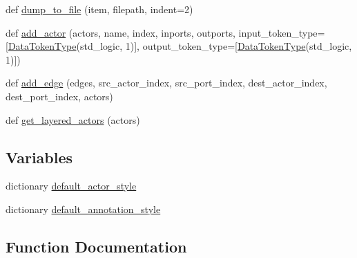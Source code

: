 \begin{DoxyCompactItemize}
\item 
def \hyperlink{namespacesylva_1_1base_1_1sdf_a55c1c6ea91b0ed9948ce670cd269b88b}{dump\+\_\+to\+\_\+file} (item, filepath, indent=2)
\item 
def \hyperlink{namespacesylva_1_1base_1_1sdf_a2fc075a9dc81209dee7a5b97d99640e5}{add\+\_\+actor} (actors, name, index, inports, outports, input\+\_\+token\+\_\+type=\mbox{[}\hyperlink{classsylva_1_1base_1_1sdf_1_1_data_token_type}{Data\+Token\+Type}(\textquotesingle{}std\+\_\+logic\textquotesingle{}, 1)\mbox{]}, output\+\_\+token\+\_\+type=\mbox{[}\hyperlink{classsylva_1_1base_1_1sdf_1_1_data_token_type}{Data\+Token\+Type}(\textquotesingle{}std\+\_\+logic\textquotesingle{}, 1)\mbox{]})
\item 
def \hyperlink{namespacesylva_1_1base_1_1sdf_aecda5e2c5810b35f98a0466a348af120}{add\+\_\+edge} (edges, src\+\_\+actor\+\_\+index, src\+\_\+port\+\_\+index, dest\+\_\+actor\+\_\+index, dest\+\_\+port\+\_\+index, actors)
\item 
def \hyperlink{namespacesylva_1_1base_1_1sdf_a1e0fb379d9b6a1f2adb650611bdb49e6}{get\+\_\+layered\+\_\+actors} (actors)
\end{DoxyCompactItemize}
\subsection*{Variables}
\begin{DoxyCompactItemize}
\item 
dictionary \hyperlink{namespacesylva_1_1base_1_1sdf_a39d9eb96b3c8367d46f62630c694532a}{default\+\_\+actor\+\_\+style}
\item 
dictionary \hyperlink{namespacesylva_1_1base_1_1sdf_a2fc7e4f9875075ae2cc4d82650265733}{default\+\_\+annotation\+\_\+style}
\end{DoxyCompactItemize}


\subsection{Function Documentation}
\mbox{\label{namespacesylva_1_1base_1_1sdf_a2fc075a9dc81209dee7a5b97d99640e5}} 
